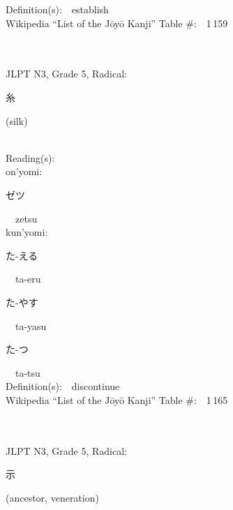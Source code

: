 \begin{multicols}{2}
Definition(s):\ \ establish \\
Wikipedia ``List of the J\=oy\=o Kanji'' Table \#:\ \ 1\,159 \\
\ \ \\
{\fontsize{34pt}{40pt}  }\ \ \\  %
{JLPT N3, Grade 5, Radical:\ \ {\begin{CJK}{UTF8}{min} 糸 \end{CJK}} (silk) } \\
Reading(s):\ \ \\
{\hspace*{1em}}on'yomi:\ \ \\
{\hspace*{2em}}{\begin{CJK}{UTF8}{min} ゼツ \end{CJK}}\ \ zetsu\ \ \\
{\hspace*{1em}}kun'yomi:\ \ \\
{\hspace*{2em}}{\begin{CJK}{UTF8}{min} た-える \end{CJK}}\ \ ta-eru\ \ \\
{\hspace*{2em}}{\begin{CJK}{UTF8}{min} た-やす \end{CJK}}\ \ ta-yasu\ \ \\
{\hspace*{2em}}{\begin{CJK}{UTF8}{min} た-つ \end{CJK}}\ \ ta-tsu\ \ \\
Definition(s):\ \ discontinue \\
Wikipedia ``List of the J\=oy\=o Kanji'' Table \#:\ \ 1\,165 \\
\ \ \\
{\fontsize{34pt}{40pt}  }\ \ \\  %
{JLPT N3, Grade 5, Radical:\ \ {\begin{CJK}{UTF8}{min} 示 \end{CJK}} (ancestor, veneration) } \\

\end{multicols}
